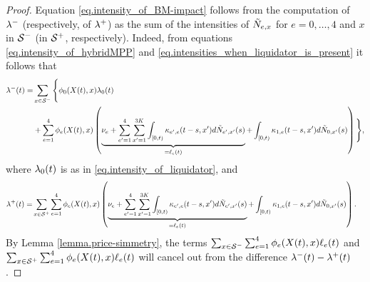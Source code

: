\documentclass[10pt, article,table]{article}
\begin{document}
\begin{proof}
 Equation \eqref{eq.intensity_of_BM-impact} follows from the computation of $\intensityDeflationary$ (respectively, of $\intensityInflationary$) as the sum of the intensities of $\hybridHawkes_{e,x}$ for $e = 0,\dots,4$ and $x$ in $\deflationarySpace$ (in $\inflationarySpace$, respectively). Indeed, from equations \eqref{eq.intensity_of_hybridMPP} and \eqref{eq.intensities_when_liquidator_is_present} it follows that 
 \begin{equation*}
 \begin{split}
  \intensityDeflationary(t) 
  =&
  \sum_{x\in\deflationarySpace}\Bigg\lbrace
  \transProb_{0}(\stateVariable(t),x) \intensity[0](t)
  \\
  &  +
  \sum_{e=1}^{4} \transProb_{e}(\stateVariable(t),x) 
  \left(
  \underbrace{
  \baseRate_e 
 + \sum_{\eone = 1}^{4}\sum_{\xone=1}^{3K}\int_{[0,t)} \hawkesKernel_{\eone,e}(t-s,\xone)d\hybridHawkes_{\eone,\xone}(s)
 }_{=\ell_{e}(t)}
 + \int_{[0,t)} \hawkesKernel_{1,e}(t-s,\xone)d\hybridHawkes_{0,\xone}(s)
 \right)
  \Bigg\rbrace,
  \\
  \end{split}
 \end{equation*}
 where $\intensity[0](t)$ is as in \eqref{eq.intensity_of_liquidator}, and 
 \begin{equation*}
 \begin{split}
  \intensityInflationary(t) 
  =&
  \sum_{x\in\inflationarySpace}
  \sum_{e=1}^{4} \transProb_{e}(\stateVariable(t),x) 
  \left(
  \underbrace{
  \baseRate_e 
 + \sum_{\eone = 1}^{4}\sum_{\xone=1}^{3K}\int_{[0,t)} \hawkesKernel_{\eone,e}(t-s,\xone)d\hybridHawkes_{\eone,\xone}(s)
 }_{=\ell_{e}(t)}
 + \int_{[0,t)} \hawkesKernel_{1,e}(t-s,\xone)d\hybridHawkes_{0,\xone}(s)
 \right).
   \end{split}
 \end{equation*}
 By Lemma \ref{lemma.price-simmetry}, the terms $\sum_{x\in\deflationarySpace}\sum_{e=1}^{4}\transProb_{e}(\stateVariable(t),x) \ell_{e}(t)$ and $\sum_{x\in\inflationarySpace}\sum_{e=1}^{4}\transProb_{e}(\stateVariable(t),x) \ell_{e}(t)$ will  cancel out from the difference $\intensityDeflationary(t) - \intensityInflationary(t)$. 
 \end{proof}
 
\end{document}
